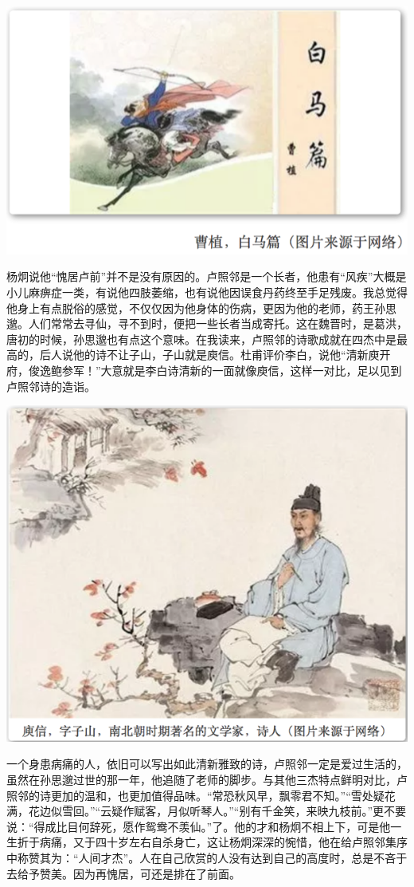 \documentclass[]{book}
\begin{document}
\includegraphics[width=8.33in]{images/ctsj2}

杨炯说他``愧居卢前''并不是没有原因的。卢照邻是一个长者，他患有``风疾''大概是小儿麻痹症一类，有说他四肢萎缩，也有说他因误食丹药终至手足残废。我总觉得他身上有点脱俗的感觉，不仅仅因为他身体的伤病，更因为他的老师，药王孙思邈。人们常常去寻仙，寻不到时，便把一些长者当成寄托。这在魏晋时，是葛洪，唐初的时候，孙思邈也有点这个意味。在我读来，卢照邻的诗歌成就在四杰中是最高的，后人说他的诗不让子山，子山就是庾信。杜甫评价李白，说他``清新庾开府，俊逸鲍参军！''大意就是李白诗清新的一面就像庾信，这样一对比，足以见到卢照邻诗的造诣。

\includegraphics[width=8.33in]{images/ctsj3}

一个身患病痛的人，依旧可以写出如此清新雅致的诗，卢照邻一定是爱过生活的，虽然在孙思邈过世的那一年，他追随了老师的脚步。与其他三杰特点鲜明对比，卢照邻的诗更加的温和，也更加值得品味。``常恐秋风早，飘零君不知。''``雪处疑花满，花边似雪回。''``云疑作赋客，月似听琴人。''``别有千金笑，来映九枝前。''更不要说：``得成比目何辞死，愿作鸳鸯不羡仙。''了。他的才和杨炯不相上下，可是他一生折于病痛，又于四十岁左右自杀身亡，这让杨炯深深的惋惜，他在给卢照邻集序中称赞其为：``人间才杰''。人在自己欣赏的人没有达到自己的高度时，总是不吝于去给予赞美。因为再愧居，可还是排在了前面。
\end{document}
